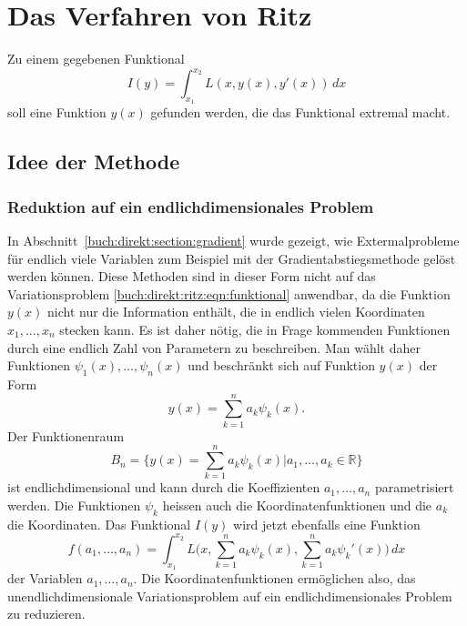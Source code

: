 %
%
%
\section{Das Verfahren von Ritz
\label{buch:direkt:section:ritz}}
Zu einem gegebenen Funktional
\begin{equation}
I(y)
=
\int_{x_1}^{x_2}
L(x,y(x),y'(x))
\,dx
\label{buch:direkt:ritz:eqn:funktional}
\end{equation}
soll eine Funktion $y(x)$ gefunden werden, die das Funktional
extremal macht.

%
%
\subsection{Idee der Methode}

%
%
\subsubsection{Reduktion auf ein endlichdimensionales Problem}
In Abschnitt~\ref{buch:direkt:section:gradient} wurde gezeigt, wie 
Extermalprobleme für endlich viele Variablen zum Beispiel mit der
Gradientabstiegsmethode gelöst werden können.
Diese Methoden sind in dieser Form nicht auf das Variationsproblem
\eqref{buch:direkt:ritz:eqn:funktional} anwendbar, da die Funktion
$y(x)$ nicht nur die Information enthält, die in endlich vielen
Koordinaten $x_1,\dots,x_n$ stecken kann.
Es ist daher nötig, die in Frage kommenden Funktionen durch eine
endlich Zahl von Parametern zu beschreiben.
Man wählt daher Funktionen $\psi_1(x),\dots,\psi_n(x)$ und beschränkt
sich auf Funktion $y(x)$ der Form
\[
y(x)
=
\sum_{k=1}^n
a_k \psi_k(x).
\]
Der Funktionenraum 
\[
B_n
=
\biggl\{
y(x)
=
\sum_{k=1}^n a_k\psi_k(x)
\bigg|
a_1,\dots,a_k\in\mathbb{R}
\biggr\}
\]
ist endlichdimensional und kann durch die Koeffizienten $a_1,\dots,a_n$
parametrisiert werden.
Die Funktionen $\psi_k$ heissen auch die Koordinatenfunktionen und die
$a_k$ die Koordinaten.
Das Funktional $I(y)$ wird jetzt ebenfalls eine Funktion
\[
f(a_1,\dots,a_n)
=
\int_{x_1}^{x_2}
L\biggl(x,
\sum_{k=1}^n a_k\psi_k(x),
\sum_{k=1}^n a_k\psi_k'(x)
\biggr)
\,dx
\]
der Variablen $a_1,\dots,a_n$.
Die Koordinatenfunktionen ermöglichen also, das unendlichdimensionale
Variationsproblem auf ein endlichdimensionales Problem zu reduzieren.

%
%
